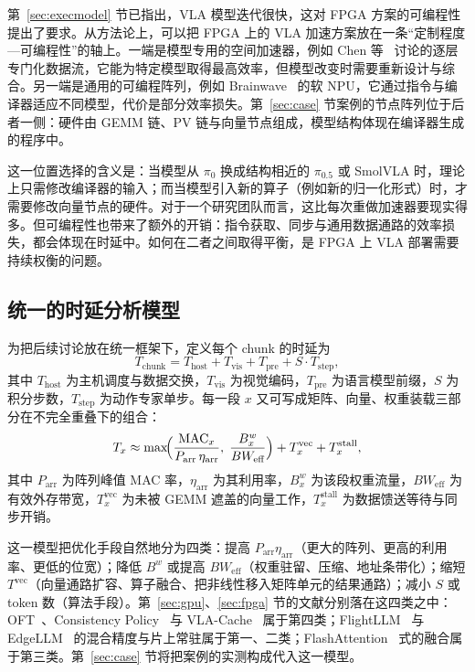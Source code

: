 \documentclass[a4paper,10.5pt]{ctexart}
\newcommand{\pizero}{$\pi_0$}
\newcommand{\pihalf}{$\pi_{0.5}$}
\begin{document}
第~\ref{sec:execmodel} 节已指出，VLA 模型迭代很快，这对 FPGA 方案的可编程性提出了要求。从方法论上，可以把 FPGA 上的 VLA 加速方案放在一条“定制程度—可编程性”的轴上。一端是模型专用的空间加速器，例如 Chen 等~\cite{chen2024trets} 讨论的逐层专门化数据流，它能为特定模型取得最高效率，但模型改变时需要重新设计与综合。另一端是通用的可编程阵列，例如 Brainwave~\cite{brainwave} 的软 NPU，它通过指令与编译器适应不同模型，代价是部分效率损失。第~\ref{sec:case} 节案例的节点阵列位于后者一侧：硬件由 GEMM 链、PV 链与向量节点组成，模型结构体现在编译器生成的程序中。

这一位置选择的含义是：当模型从 \pizero{} 换成结构相近的 \pihalf{} 或 SmolVLA 时，理论上只需修改编译器的输入；而当模型引入新的算子（例如新的归一化形式）时，才需要修改向量节点的硬件。对于一个研究团队而言，这比每次重做加速器要现实得多。但可编程性也带来了额外的开销：指令获取、同步与通用数据通路的效率损失，都会体现在时延中。如何在二者之间取得平衡，是 FPGA 上 VLA 部署需要持续权衡的问题。

\subsection{统一的时延分析模型}\label{sec:model}

为把后续讨论放在统一框架下，定义每个 chunk 的时延为
\begin{equation}
  T_{\text{chunk}} = T_{\text{host}} + T_{\text{vis}} + T_{\text{pre}} + S\cdot T_{\text{step}},
  \label{eq:tchunk}
\end{equation}
其中 $T_{\text{host}}$ 为主机调度与数据交换，$T_{\text{vis}}$ 为视觉编码，$T_{\text{pre}}$ 为语言模型前缀，$S$ 为积分步数，$T_{\text{step}}$ 为动作专家单步。每一段 $x$ 又可写成矩阵、向量、权重装载三部分在不完全重叠下的组合：
\begin{equation}
  T_{x} \approx \max\!\Bigl(\frac{\mathrm{MAC}_x}{P_{\text{arr}}\,\eta_{\text{arr}}},\;\frac{B^{w}_x}{BW_{\text{eff}}}\Bigr) + T^{\text{vec}}_x + T^{\text{stall}}_x,
  \label{eq:tx}
\end{equation}
其中 $P_{\text{arr}}$ 为阵列峰值 MAC 率，$\eta_{\text{arr}}$ 为其利用率，$B^{w}_x$ 为该段权重流量，$BW_{\text{eff}}$ 为有效外存带宽，$T^{\text{vec}}_x$ 为未被 GEMM 遮盖的向量工作，$T^{\text{stall}}_x$ 为数据馈送等待与同步开销。

这一模型把优化手段自然地分为四类：提高 $P_{\text{arr}}\eta_{\text{arr}}$（更大的阵列、更高的利用率、更低的位宽）；降低 $B^{w}$ 或提高 $BW_{\text{eff}}$（权重驻留、压缩、地址条带化）；缩短 $T^{\text{vec}}$（向量通路扩容、算子融合、把非线性移入矩阵单元的结果通路）；减小 $S$ 或 token 数（算法手段）。第~\ref{sec:gpu}、\ref{sec:fpga} 节的文献分别落在这四类之中：OFT~\cite{openvlaoft}、Consistency Policy~\cite{consistencypolicy} 与 VLA-Cache~\cite{vlacache} 属于第四类；FlightLLM~\cite{flightllm} 与 EdgeLLM~\cite{edgellm} 的混合精度与片上常驻属于第一、二类；FlashAttention~\cite{flashattn} 式的融合属于第三类。第~\ref{sec:case} 节将把案例的实测构成代入这一模型。
\end{document}
